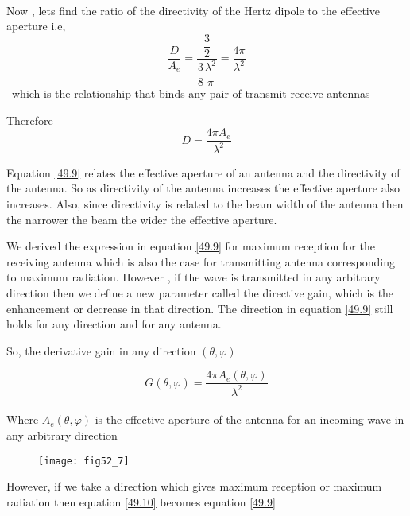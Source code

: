 \paragraph{}Now , lets find the ratio  of the directivity of the Hertz dipole to the effective aperture i.e,
$$\dfrac{D}{A_{e}}=\dfrac{\dfrac{3}{2}}{\dfrac{3}{8}\dfrac{\lambda^{2}}{\pi}}= \dfrac{4\pi}{\lambda^{2}}$$ \ which is the relationship that binds any pair of transmit-receive antennas
\newline

Therefore
\begin{equation}
\label{49.9}
D=\dfrac{4\pi A_{e}}{\lambda^{2}}
\end{equation}

Equation \ref{49.9} relates the effective aperture of an antenna and the directivity of the antenna. So as directivity of the antenna increases the effective aperture also increases. Also, since directivity is related to the beam width of the antenna then the narrower the beam the wider the effective aperture.
\newline

We derived the expression in equation \ref{49.9} for maximum reception for the receiving antenna which is also the case for transmitting antenna corresponding to maximum radiation. However , if the wave is transmitted in any arbitrary direction then we define a new parameter called the directive gain, which is the enhancement or decrease in that direction. The direction in equation \ref{49.9} still holds for any direction and for any antenna.

So, the derivative gain in any direction $(\theta, \varphi)$ 

\begin{equation}
\label{49.10}
G(\theta, \varphi)=\dfrac{4 \pi A_{e}(\theta, \varphi)}{\lambda^{2}}
\end{equation}
\paragraph{} Where $A_{e}(\theta, \varphi)$ is the effective aperture of the antenna for an incoming wave in any arbitrary direction

\begin{figure}[h]
	\texttt{[image: fig52\_7]}
	\centering
	\centering
	\caption{}
	\label{fig 1}	
\end{figure}



However, if we take a direction which gives maximum reception or maximum radiation then equation \ref{49.10} becomes equation \ref{49.9}


